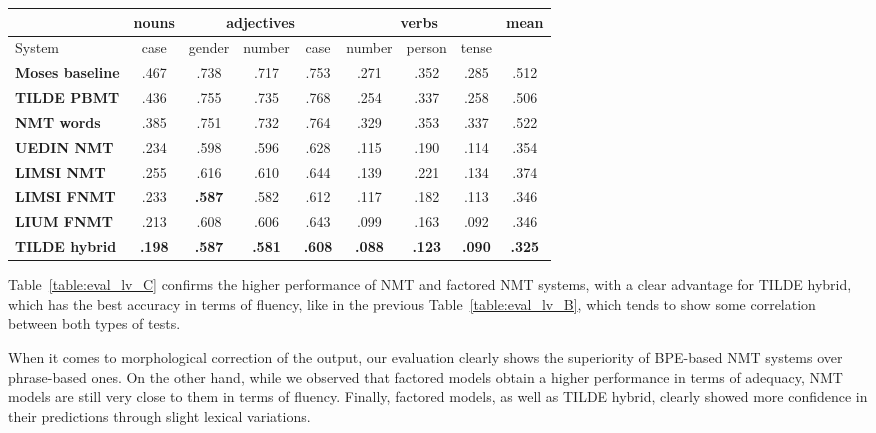 \documentclass[11pt,letterpaper,final,nohyperref]{article}
\begin{document}
\begin{table*}[tb] %
\begin{center}
\small
\begin{tabular}{ l|c|ccc|ccc||c } 
\hline
& \multicolumn{1}{c}{\textbf{nouns}} & \multicolumn{3}{c}{\textbf{adjectives}} & \multicolumn{3}{c}{\textbf{verbs}} & \multicolumn{1}{c}{\textbf{mean}} \\
\hline
System & case & gender & number & case & number & person & tense & \\
\hline
\textbf{Moses baseline} & .467 & .738 & .717 & .753 & .271 & .352 & .285 & .512 \\ 
\textbf{TILDE PBMT}     & .436 & .755 & .735 & .768 & .254 & .337 & .258 & .506 \\
\textbf{NMT words}      & .385 & .751 & .732 & .764 & .329 & .353 & .337 & .522 \\ 
\textbf{UEDIN NMT}      & .234 & .598 & .596 & .628 & .115 & .190 & .114 & .354 \\ 
\textbf{LIMSI NMT}      & .255 & .616 & .610 & .644 & .139 & .221 & .134 & .374 \\ 
\textbf{LIMSI FNMT}     & .233 & \textbf{.587} & .582 & .612 & .117 & .182 & .113 & .346 \\
\textbf{LIUM FNMT}      & .213 & .608 & .606 & .643 & .099 & .163 & .092 & .346 \\ 
\textbf{TILDE hybrid}   & \textbf{.198} & \textbf{.587} & \textbf{.581} & \textbf{.608} & \textbf{.088} & \textbf{.123} & \textbf{.090} & \textbf{.325} \\ 
\hline
 \end{tabular} 
\caption{\label{table:eval_lv_C} Sentence group evaluation for English-to-Latvian with Entropy (C-set).}
\end{center}
\end{table*}

Table~\ref{table:eval_lv_C} confirms the higher performance
of NMT and factored NMT systems, with a clear advantage for TILDE hybrid,
which has the best accuracy in terms of fluency, like in the previous Table~\ref{table:eval_lv_B},
which tends to show some correlation between both
types of tests.

When it comes to morphological correction of the output,
our evaluation clearly shows the superiority of BPE-based
NMT systems over phrase-based ones. On the other hand, while we observed
that factored models obtain a higher performance in terms of
adequacy, NMT models are still very close to them in terms
of fluency. Finally, factored models, as well as TILDE hybrid, clearly showed more
confidence in their predictions through slight lexical variations.
\end{document}
